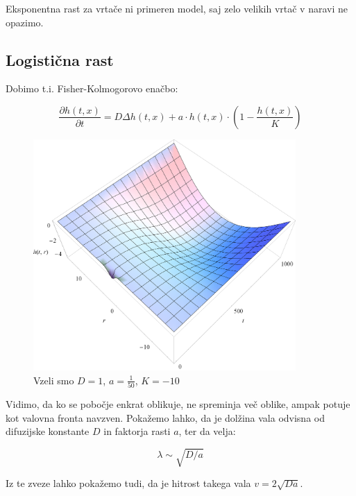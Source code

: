 \documentclass[a4paper, oneside, 12pt]{book}
\begin{document}
            Eksponentna rast za vrtače ni primeren model, saj zelo velikih vrtač v naravi ne opazimo.


          \subsection{Logistična rast}

            Dobimo t.i. Fisher-Kolmogorovo enačbo:

            \begin{equation}
              \frac{ \partial h(t,x) }{ \partial t} = D \Delta h(t,x) + a \cdot h(t,x) \cdot (1 - \frac{h(t,x)}{K})
              \label{difuzija-logisticna-rast}
            \end{equation}

            \begin{figure}[H]
              \begin{center}
                \includegraphics[width=10cm]{slike/difuzija-logisticna-rast2}
              \end{center}
              \caption{Vzeli smo $D=1$, $a=\frac{1}{50}$, $K=-10$}
              \label{fig:difuzija-logisticna-rast}
            \end{figure}

            Vidimo, da ko se pobočje enkrat oblikuje, ne spreminja več oblike, ampak potuje kot valovna fronta navzven. Pokažemo lahko, da je dolžina vala odvisna od difuzijske konstante $D$ in faktorja rasti $a$, ter da velja: 

           \[ \lambda \sim \sqrt{D/a} \]

          Iz te zveze lahko pokažemo tudi, da je hitrost takega vala $v = 2 \sqrt{D a}$.
\end{document}
